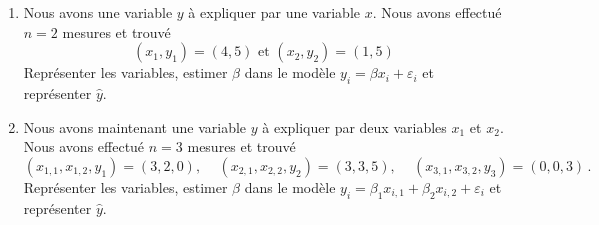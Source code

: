 \documentclass{../headers/td_upc}
\providecommand{\1}{\mathds{1}}
\begin{document}
\cor{\newpage}
	
	\begin{enumerate}
		\item Nous avons une variable $y$ à expliquer par une variable $x$. Nous avons effectué $n=2$ mesures et trouvé
		\[
		\left(x_{1}, y_{1}\right)=(4,5) \text { et }\left(x_{2}, y_{2}\right)=(1,5)
		\]
		Représenter les variables, estimer $\beta$ dans le modèle $y_{i}=\beta x_{i}+\varepsilon_{i}$ et représenter $\hat{y}$.
		\item Nous avons maintenant une variable $y$ à expliquer par deux variables $x_{1}$ et $x_{2}$. Nous avons effectué $n=3$ mesures et trouvé
		\[
		(x_{1,1}, x_{1,2},y_{1})=(3,2,0),\,\quad
		(x_{2,1}, x_{2,2}, y_{2})=(3,3,5),\,\quad
		(x_{3,1}, x_{3,2}, y_{3})=(0,0,3)\,.
		\]
		Représenter les variables, estimer $\beta$ dans le modèle $y_{i}=\beta_{1} x_{i, 1}+\beta_{2} x_{i, 2}+\varepsilon_{i}$
		et représenter $\hat{y}$.
	\end{enumerate}
	
\end{document}
